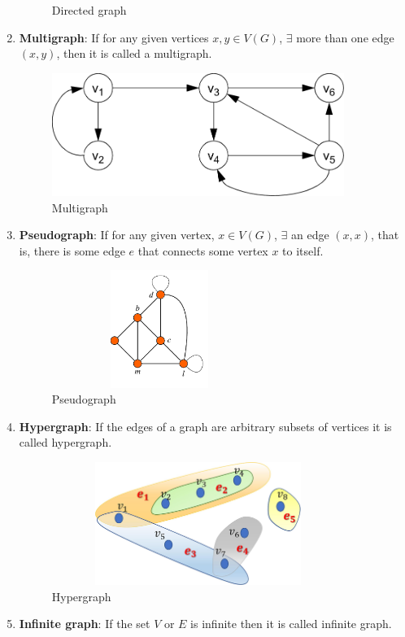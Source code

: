 \documentclass[../basic_graph_theory.tex]{subfiles}
\begin{document}
\begin{enumerate}
\begin{figure}[hbt!]
              \caption{Directed graph}
          \end{figure}
    \item \textbf{Multigraph}: If for any given vertices $x,y \in V(G)$, $\exists$ more than one edge $(x,y)$, then it is called a multigraph.
          \begin{figure}[hbt!]
              \centering
              \includegraphics[height=4cm, width=9.5cm]{../images/multi.png}
              \caption{Multigraph}
          \end{figure}
    \item \textbf{Pseudograph}: If for any given vertex, $x \in V(G)$, $\exists$ an edge $(x,x)$, that is, there is some edge $e$ that connects some vertex $x$ to itself.
          \begin{figure}[hbt!]
              \centering
              \includegraphics[height=3.82cm, width=7cm]{../images/pseudo.png}
              \caption{Pseudograph}
          \end{figure}
    \item \textbf{Hypergraph}: If the edges of a graph are arbitrary subsets of vertices it is called hypergraph.
          \begin{figure}[hbt!]
              \centering
              \includegraphics[height=4cm, width=9.5cm]{../images/hyper.jpg}
              \caption{Hypergraph}
          \end{figure}
    \item \textbf{Infinite graph}: If the set $V$ or $E$ is infinite then it is called infinite graph.
\end{enumerate}
\end{document}
